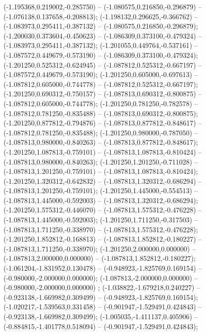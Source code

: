  (-1.195368,0.219002,-0.285750) -- (-1.080575,0.216850,-0.296879) -- (-1.076138,0.137658,-0.208813);
 (-1.198132,0.296625,-0.366762) -- (-1.083973,0.295411,-0.387132) -- (-1.080575,0.216850,-0.296879);
 (-1.200030,0.373604,-0.450623) -- (-1.086309,0.373100,-0.479324) -- (-1.083973,0.295411,-0.387132);
 (-1.201055,0.449764,-0.537161) -- (-1.087572,0.449679,-0.573190) -- (-1.086309,0.373100,-0.479324);
 (-1.201250,0.525312,-0.624945) -- (-1.087812,0.525312,-0.667197) -- (-1.087572,0.449679,-0.573190);
 (-1.201250,0.605000,-0.697613) -- (-1.087812,0.605000,-0.744778) -- (-1.087812,0.525312,-0.667197);
 (-1.201250,0.690312,-0.750157) -- (-1.087813,0.690312,-0.800875) -- (-1.087812,0.605000,-0.744778);
 (-1.201250,0.781250,-0.782578) -- (-1.087812,0.781250,-0.835488) -- (-1.087813,0.690312,-0.800875);
 (-1.201250,0.877812,-0.794876) -- (-1.087813,0.877812,-0.848617) -- (-1.087812,0.781250,-0.835488);
 (-1.201250,0.980000,-0.787050) -- (-1.087813,0.980000,-0.840263) -- (-1.087813,0.877812,-0.848617);
 (-1.201250,1.087813,-0.759101) -- (-1.087813,1.087813,-0.810424) -- (-1.087813,0.980000,-0.840263);
 (-1.201250,1.201250,-0.711028) -- (-1.087813,1.201250,-0.759101) -- (-1.087813,1.087813,-0.810424);
 (-1.201250,1.320312,-0.642832) -- (-1.087813,1.320312,-0.686294) -- (-1.087813,1.201250,-0.759101);
 (-1.201250,1.445000,-0.554513) -- (-1.087813,1.445000,-0.592003) -- (-1.087813,1.320312,-0.686294);
 (-1.201250,1.575312,-0.446070) -- (-1.087813,1.575312,-0.476228) -- (-1.087813,1.445000,-0.592003);
 (-1.201250,1.711250,-0.317503) -- (-1.087813,1.711250,-0.338970) -- (-1.087813,1.575312,-0.476228);
 (-1.201250,1.852812,-0.168813) -- (-1.087813,1.852812,-0.180227) -- (-1.087813,1.711250,-0.338970);
 (-1.201250,2.000000,0.000000) -- (-1.087813,2.000000,0.000000) -- (-1.087813,1.852812,-0.180227);
 (-1.061204,-1.831952,0.130478) -- (-0.948923,-1.825769,0.169154) -- (-0.980000,-2.000000,0.000000);
 (-1.087813,-2.000000,0.000000) -- (-0.980000,-2.000000,0.000000) ;
 (-1.038822,-1.679218,0.240227) -- (-0.923138,-1.669982,0.309499) -- (-0.948923,-1.825769,0.169154);
 (-1.020217,-1.539563,0.331458) -- (-0.901947,-1.529491,0.424843) -- (-0.923138,-1.669982,0.309499);
 (-1.005035,-1.411137,0.405906) -- (-0.884815,-1.401778,0.518094) -- (-0.901947,-1.529491,0.424843);
